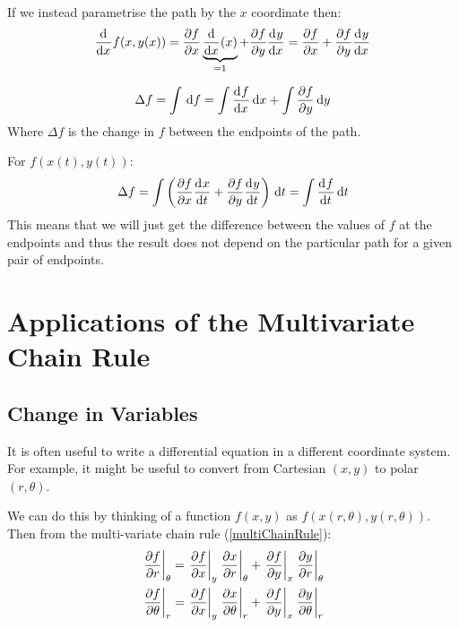 \documentclass[../main.tex]{subfiles}
\begin{document}
If we instead parametrise the path by the $x$ coordinate then:
\[
  \deriv{}{x}f(x, y(x)) = \pderiv{f}{x} \underbrace{\deriv{}{x}(x)}_{=1} + \pderiv{f}{y} \deriv{y}{x} = \pderiv{f}{x} + \pderiv{f}{y}\deriv{y}{x}
\]
\begin{theorem}
  \[
    \Delta f = \int  \d{f} = \int \deriv{f}{x} \d{x} + \int \pderiv{f}{y} \d{y}
    \label{multiChainRule}
  \]
  Where $\Delta f$ is the change in $f$ between the endpoints of the path.
\end{theorem}
For $f(x(t), y(t))$:
\[
  \Delta f = \int \left(\pderiv{f}{x}\deriv{x}{t} + \pderiv{f}{y}\deriv{y}{t}\right) \d{t} = \int \deriv{f}{t} \d{t}
\]
This means that we will just get the difference between the values of $f$ at the endpoints and thus the result does not depend on the particular path for a given pair of endpoints.
\section{Applications of the Multivariate Chain Rule}
\subsection{Change in Variables}
It is often useful to write a differential equation in a different coordinate system.
For example, it might be useful to convert from Cartesian $(x, y)$ to polar $(r, \theta)$.

We can do this by thinking of a function $f(x, y)$ as $f(x(r, \theta), y(r, \theta))$.
Then from the multi-variate chain rule (\cref{multiChainRule}):
\begin{align*}
  \at{\pderiv{f}{r}}{\theta} &= \at{\pderiv{f}{x}}{y} \at{\pderiv{x}{r}}{\theta} + \at{\pderiv{f}{y}}{x} \at{\pderiv{y}{r}}{\theta} \\
  \at{\pderiv{f}{\theta}}{r} &= \at{\pderiv{f}{x}}{y} \at{\pderiv{x}{\theta}}{r} + \at{\pderiv{f}{y}}{x} \at{\pderiv{y}{\theta}}{r}
\end{align*}
\end{document}

